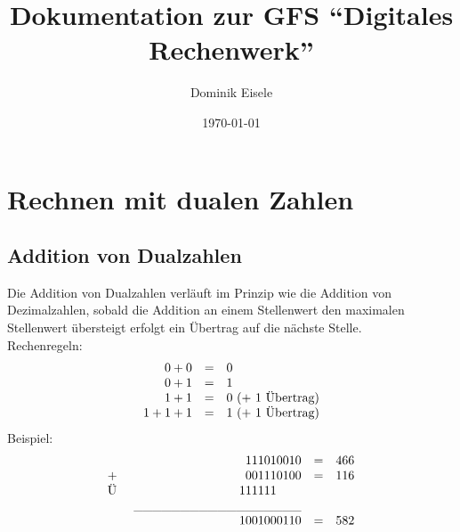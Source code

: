 \documentclass[a4paper,12pt,fleqn,oneside]{article}
\author{Dominik Eisele}
\title{Dokumentation zur GFS "`Digitales Rechenwerk"'}
\date{\today}
\begin{document}
\normalem



\begin{titlepage}
	\maketitle

\end{titlepage}
	\tableofcontents

\newpage


   \section{Rechnen mit dualen Zahlen}
	\subsection{Addition von Dualzahlen}
		Die Addition von Dualzahlen verläuft im Prinzip wie die Addition von Dezimalzahlen, sobald die Addition an einem 					Stellenwert den maximalen Stellenwert übersteigt erfolgt ein Übertrag auf die nächste Stelle.\\
		Rechenregeln:
		\[ \begin{array}{rcll}
   				 0 + 0 & = & 0													\\
  			         0 + 1 & = & 1													\\
    				 1 + 1 & = & 0$ (+ 1 Übertrag)$										\\
    			   1 + 1 + 1 & = & 1$ (+ 1 Übertrag)$
		\end{array} \]
		Beispiel:
		\[ \begin{array}{lrcll}
   					&		 	       	 1 1 1 0 1 0 0 1 0 		 	 & = & 466 		\\
  			       	$+ $ &				 0 0 1 1 1 0 1 0 0			 & = & 116		\\
  			       	$Ü $ &      			      1 1 1 1 1 1$ $$ $$ $$ $$ $$ $         				\\            
    					&	\_\_\_\_\_\_\_\_\_\_\_\_\_\_\_\_\_\_							\\
    			   		&			      1 0 0 1 0 0 0 1 1 0			 & = & 582
		\end{array} \]
		
\newpage
  
\end{document}
